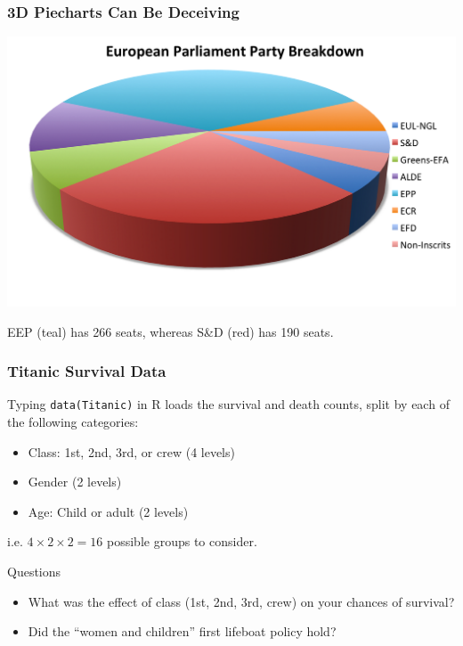 \documentclass[handout]{beamer}
\begin{document}
\begin{frame}[fragile]
\frametitle{3D Piecharts Can Be Deceiving}

\begin{center}
\includegraphics[width=\textwidth]{figure/europe.png}
\end{center}

EEP (teal) has 266 seats, whereas S\&D (red) has 190 seats.  


\end{frame}


\begin{frame}[fragile]
\frametitle{Titanic Survival Data}

Typing {\tt data(Titanic)} in R loads the survival and death counts, split by each of the following categories:

\pause \begin{itemize}
\item Class: 1st, 2nd, 3rd, or crew (4 levels)
\item Gender (2 levels)
\item Age: Child or adult (2 levels)
\end{itemize}

i.e. $4 \times 2 \times 2 = 16$ possible groups to consider.

\vspace{0.25cm}

Questions 

\begin{itemize}
\pause \item What was the effect of class (1st, 2nd, 3rd, crew) on your chances of survival?
\pause \item Did the ``women and children'' first lifeboat policy hold?
\end{itemize} 

\end{frame}
\end{document}
